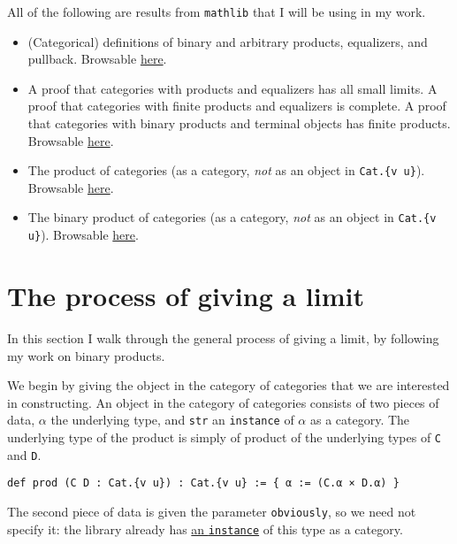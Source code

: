 \documentclass{article}
\newcommand{\al}{\alpha}
\newcommand{\<}{\langle}
\renewcommand{\>}{\rangle}
\theoremstyle{definitionstyle}
\theoremstyle{exercisestyle}
\theoremstyle{remarkstyle}
\begin{document}
All of the following are results from \texttt{mathlib} that I will be using in my work.
\begin{itemize}
  \item (Categorical) definitions of binary and arbitrary products,
        equalizers, and pullback.
        Browsable \href{https://leanprover-community.github.io/mathlib_docs/category_theory/limits/shapes/products.html}{here}.
  \item A proof that categories with products and equalizers has all small limits.
        A proof that categories with finite products and equalizers is complete.
        A proof that categories with binary products and terminal objects has finite products.
        Browsable \href{https://leanprover-community.github.io/mathlib_docs/category_theory/limits/constructions/limits_of_products_and_equalizers.html}{here}.
  \item The product of categories (as a category, \textit{not} as an object in \texttt{Cat.\{v u\}}).
        Browsable \href{https://leanprover-community.github.io/mathlib_docs/category_theory/pi/basic.html}{here}.
  \item The binary product of categories (as a category, \textit{not} as an object in \texttt{Cat.\{v u\}}).
        Browsable \href{https://leanprover-community.github.io/mathlib_docs/category_theory/products/basic.html}{here}.
\end{itemize}

\section{The process of giving a limit}

In this section I walk through the general process of giving a limit,
by following my work on binary products.

We begin by giving the object in the category of categories
that we are interested in constructing.
An object in the category of categories consists
of two pieces of data, $\al$ the underlying type,
and \texttt{str} an \texttt{instance} of $\al$ as a category.
The underlying type of the product is simply of product
of the underlying types of \texttt{C} and \texttt{D}.

\begin{lstlisting}
def prod (C D : Cat.{v u}) : Cat.{v u} := { α := (C.α × D.α) } \end{lstlisting}

The second piece of data is given the parameter \texttt{obviously},
so we need not specify it:
the library already has \href{https://leanprover-community.github.io/mathlib_docs/category_theory/products/basic.html}{an \texttt{instance}}
of this type as a category.
\end{document}
